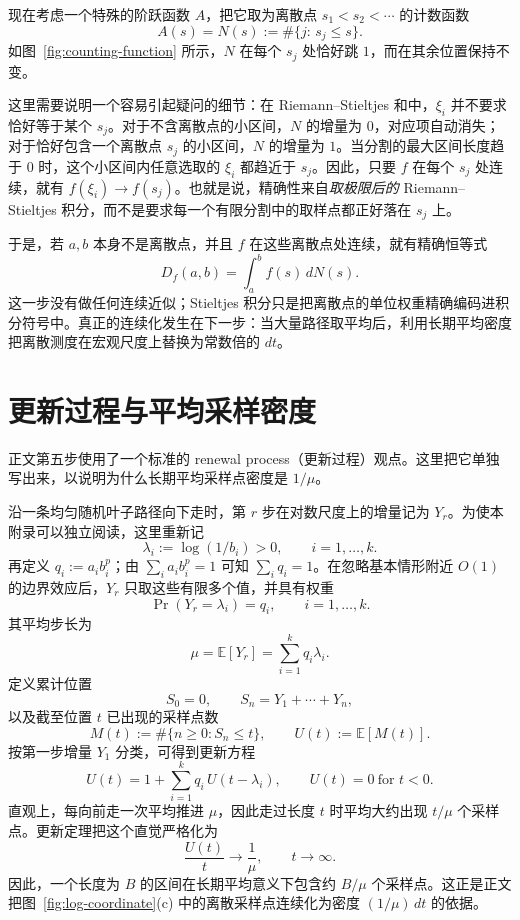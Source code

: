 \documentclass[11pt,a4paper]{article}
\begin{document}
现在考虑一个特殊的阶跃函数 $A$，把它取为离散点 $s_1<s_2<\cdots$ 的计数函数
\[
A(s)=N(s):=\#\{j:\,s_j\le s\}.
\]
如图~\ref{fig:counting-function} 所示，$N$ 在每个 $s_j$ 处恰好跳 $1$，而在其余位置保持不变。

这里需要说明一个容易引起疑问的细节：在 Riemann--Stieltjes 和中，$\xi_i$ 并不要求恰好等于某个 $s_j$。对于不含离散点的小区间，$N$ 的增量为 $0$，对应项自动消失；对于恰好包含一个离散点 $s_j$ 的小区间，$N$ 的增量为 $1$。当分割的最大区间长度趋于 $0$ 时，这个小区间内任意选取的 $\xi_i$ 都趋近于 $s_j$。因此，只要 $f$ 在每个 $s_j$ 处连续，就有 $f(\xi_i)\to f(s_j)$。也就是说，精确性来自\emph{取极限后的} Riemann--Stieltjes 积分，而不是要求每一个有限分割中的取样点都正好落在 $s_j$ 上。

于是，若 $a,b$ 本身不是离散点，并且 $f$ 在这些离散点处连续，就有精确恒等式
\begin{equation}
D_f(a,b)
=
\int_a^b f(s)\,dN(s).
\label{eq:appendix-stieltjes-exact-v35}
\end{equation}
这一步没有做任何连续近似；Stieltjes 积分只是把离散点的单位权重精确编码进积分符号中。真正的连续化发生在下一步：当大量路径取平均后，利用长期平均密度把离散测度在宏观尺度上替换为常数倍的 $dt$。


\section{更新过程与平均采样密度}
正文第五步使用了一个标准的 renewal process（更新过程）观点。这里把它单独写出来，以说明为什么长期平均采样点密度是 $1/\mu$。

沿一条均匀随机叶子路径向下走时，第 $r$ 步在对数尺度上的增量记为 $Y_r$。为使本附录可以独立阅读，这里重新记
\[
\lambda_i:=\log(1/b_i)>0,\qquad i=1,\ldots,k.
\]
再定义 $q_i:=a_i b_i^p$；由 $\sum_i a_i b_i^p=1$ 可知 $\sum_i q_i=1$。在忽略基本情形附近 $O(1)$ 的边界效应后，$Y_r$ 只取这些有限多个值，并具有权重
\[
\Pr(Y_r=\lambda_i)=q_i,
\qquad i=1,\ldots,k.
\]
其平均步长为
\[
\mu=\mathbb E[Y_r]=\sum_{i=1}^k q_i\lambda_i.
\]
定义累计位置
\[
S_0=0,\qquad S_n=Y_1+\cdots+Y_n,
\]
以及截至位置 $t$ 已出现的采样点数
\[
M(t):=\#\{n\ge 0:S_n\le t\},
\qquad U(t):=\mathbb E[M(t)].
\]
按第一步增量 $Y_1$ 分类，可得到更新方程
\[
U(t)=1+\sum_{i=1}^k q_i\,U(t-\lambda_i),
\qquad U(t)=0\ \text{for }t<0.
\]
直观上，每向前走一次平均推进 $\mu$，因此走过长度 $t$ 时平均大约出现 $t/\mu$ 个采样点。更新定理把这个直觉严格化为
\[
\frac{U(t)}{t}\longrightarrow \frac{1}{\mu},
\qquad t\to\infty.
\]
因此，一个长度为 $B$ 的区间在长期平均意义下包含约 $B/\mu$ 个采样点。这正是正文把图~\ref{fig:log-coordinate}(c) 中的离散采样点连续化为密度 $(1/\mu)\,dt$ 的依据。
\end{document}
